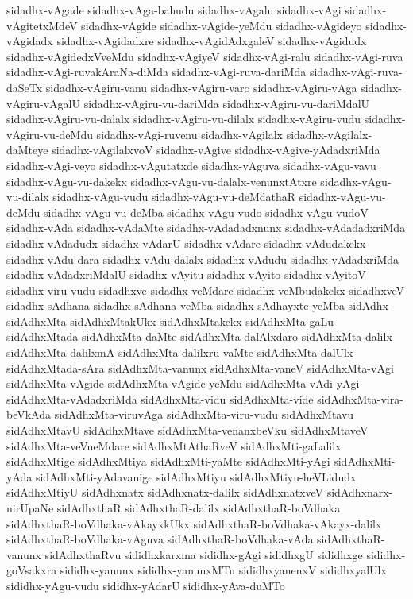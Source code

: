 {sidadhx-vAgade
sidadhx-vAga-bahudu
sidadhx-vAgalu
sidadhx-vAgi
sidadhx-vAgitetxMdeV
sidadhx-vAgide
sidadhx-vAgide-yeMdu
sidadhx-vAgideyo
sidadhx-vAgidadx
sidadhx-vAgidadxre
sidadhx-vAgidAdxgaleV
sidadhx-vAgidudx
sidadhx-vAgidedxVveMdu
sidadhx-vAgiyeV
sidadhx-vAgi-ralu
sidadhx-vAgi-ruva
sidadhx-vAgi-ruvakAraNa-diMda
sidadhx-vAgi-ruva-dariMda
sidadhx-vAgi-ruva-daSeTx
sidadhx-vAgiru-vanu
sidadhx-vAgiru-varo
sidadhx-vAgiru-vAga
sidadhx-vAgiru-vAgalU
sidadhx-vAgiru-vu-dariMda
sidadhx-vAgiru-vu-dariMdalU
sidadhx-vAgiru-vu-dalalx
sidadhx-vAgiru-vu-dilalx
sidadhx-vAgiru-vudu
sidadhx-vAgiru-vu-deMdu
sidadhx-vAgi-ruvenu
sidadhx-vAgilalx
sidadhx-vAgilalx-daMteye
sidadhx-vAgilalxvoV
sidadhx-vAgive
sidadhx-vAgive-yAdadxriMda
sidadhx-vAgi-veyo
sidadhx-vAgutatxde
sidadhx-vAguva
sidadhx-vAgu-vavu
sidadhx-vAgu-vu-dakekx
sidadhx-vAgu-vu-dalalx-venunxtAtxre
sidadhx-vAgu-vu-dilalx
sidadhx-vAgu-vudu
sidadhx-vAgu-vu-deMdathaR
sidadhx-vAgu-vu-deMdu
sidadhx-vAgu-vu-deMba
sidadhx-vAgu-vudo
sidadhx-vAgu-vudoV
sidadhx-vAda
sidadhx-vAdaMte
sidadhx-vAdadadxnunx
sidadhx-vAdadadxriMda
sidadhx-vAdadudx
sidadhx-vAdarU
sidadhx-vAdare
sidadhx-vAdudakekx
sidadhx-vAdu-dara
sidadhx-vAdu-dalalx
sidadhx-vAdudu
sidadhx-vAdadxriMda
sidadhx-vAdadxriMdalU
sidadhx-vAyitu
sidadhx-vAyito
sidadhx-vAyitoV
sidadhx-viru-vudu
sidadhxve
sidadhx-veMdare
sidadhx-veMbudakekx
sidadhxveV
sidadhx-sAdhana
sidadhx-sAdhana-veMba
sidadhx-sAdhayxte-yeMba
sidAdhx
sidAdhxMta
sidAdhxMtakUkx
sidAdhxMtakekx
sidAdhxMta-gaLu
sidAdhxMtada
sidAdhxMta-daMte
sidAdhxMta-dalAlxdaro
sidAdhxMta-dalilx
sidAdhxMta-dalilxmA
sidAdhxMta-dalilxru-vaMte
sidAdhxMta-dalUlx
sidAdhxMtada-sAra
sidAdhxMta-vanunx
sidAdhxMta-vaneV
sidAdhxMta-vAgi
sidAdhxMta-vAgide
sidAdhxMta-vAgide-yeMdu
sidAdhxMta-vAdi-yAgi
sidAdhxMta-vAdadxriMda
sidAdhxMta-vidu
sidAdhxMta-vide
sidAdhxMta-vira-beVkAda
sidAdhxMta-viruvAga
sidAdhxMta-viru-vudu
sidAdhxMtavu
sidAdhxMtavU
sidAdhxMtave
sidAdhxMta-venanxbeVku
sidAdhxMtaveV
sidAdhxMta-veVneMdare
sidAdhxMtAthaRveV
sidAdhxMti-gaLalilx
sidAdhxMtige
sidAdhxMtiya
sidAdhxMti-yaMte
sidAdhxMti-yAgi
sidAdhxMti-yAda
sidAdhxMti-yAdavanige
sidAdhxMtiyu
sidAdhxMtiyu-heVLidudx
sidAdhxMtiyU
sidAdhxnatx
sidAdhxnatx-dalilx
sidAdhxnatxveV
sidAdhxnarx-nirUpaNe
sidAdhxthaR
sidAdhxthaR-dalilx
sidAdhxthaR-boVdhaka
sidAdhxthaR-boVdhaka-vAkayxkUkx
sidAdhxthaR-boVdhaka-vAkayx-dalilx
sidAdhxthaR-boVdhaka-vAguva
sidAdhxthaR-boVdhaka-vAda
sidAdhxthaR-vanunx
sidAdhxthaRvu
sididhxkarxma
sididhx-gAgi
sididhxgU
sididhxge
sididhx-goVsakxra
sididhx-yanunx
sididhx-yanunxMTu
sididhxyanenxV
sididhxyalUlx
sididhx-yAgu-vudu
sididhx-yAdarU
sididhx-yAva-duMTo
}
